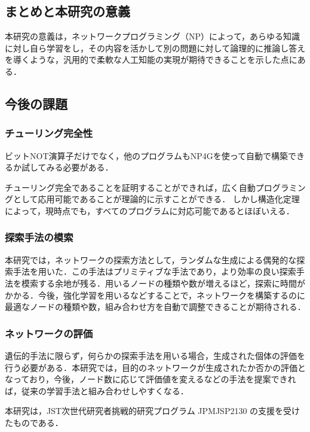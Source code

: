 \documentclass[exploratorypaper]{jsaiart} %
\begin{document}
\subsection{まとめと本研究の意義}
本研究の意義は，ネットワークプログラミング（NP）によって，あらゆる知識に対し自ら学習をし，その内容を活かして別の問題に対して論理的に推論し答えを導くような，汎用的で柔軟な人工知能の実現が期待できることを示した点にある．
\subsection{今後の課題}
\subsubsection{チューリング完全性}

ビットNOT演算子だけでなく，他のプログラムもNP4Gを使って自動で構築できるか試してみる必要がある．

チューリング完全であることを証明することができれば，広く自動プログラミングとして応用可能であることが理論的に示すことができる．
しかし構造化定理によって，現時点でも，すべてのプログラムに対応可能であるとほぼいえる．
\subsubsection{探索手法の模索}
本研究では，ネットワークの探索方法として，ランダムな生成による偶発的な探索手法を用いた．この手法はプリミティブな手法であり，より効率の良い探索手法を模索する余地が残る．用いるノードの種類や数が増えるほど，探索に時間がかかる．今後，強化学習を用いるなどすることで，ネットワークを構築するのに最適なノードの種類や数，組み合わせ方を自動で調整できることが期待される．
\subsubsection{ネットワークの評価}
遺伝的手法に限らず，何らかの探索手法を用いる場合，生成された個体の評価を行う必要がある．本研究では，目的のネットワークが生成されたか否かの評価となっており，今後，ノード数に応じて評価値を変えるなどの手法を提案できれば，従来の学習手法と組み合わせしやすくなる．

\begin{acknowledgment}
本研究は，JST次世代研究者挑戦的研究プログラム JPMJSP2130 の支援を受けたものである．
\end{acknowledgment}





\begin{biography}
\end{biography}
\end{document}
